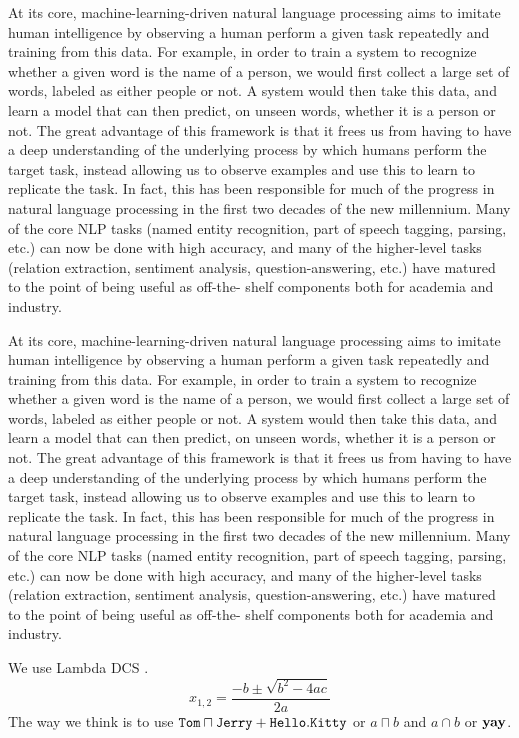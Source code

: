 
At its core, machine-learning-driven natural language processing aims to imitate human
intelligence by observing a human perform a given task repeatedly and training from this
data. For example, in order to train a system to recognize whether a given word is the
name of a person, we would first collect a large set of words, labeled as either people or
not. A system would then take this data, and learn a
model
that can then predict, on unseen
words, whether it is a person or not. The great advantage of this framework is that it frees
us from having to have a deep understanding of the underlying process by which humans
perform the target task, instead allowing us to observe examples and use this to learn to
replicate the task. In fact, this has been responsible for much of the progress in natural
language processing in the first two decades of the new millennium. Many of the core
NLP tasks (named entity recognition, part of speech tagging, parsing, etc.) can now be
done with high accuracy, and many of the higher-level tasks (relation extraction, sentiment
analysis, question-answering, etc.) have matured to the point of being useful as off-the-
shelf components both for academia and industry.

At its core, machine-learning-driven natural language processing aims to imitate human
intelligence by observing a human perform a given task repeatedly and training from this
data. For example, in order to train a system to recognize whether a given word is the
name of a person, we would first collect a large set of words, labeled as either people or
not. A system would then take this data, and learn a
model
that can then predict, on unseen
words, whether it is a person or not. The great advantage of this framework is that it frees
us from having to have a deep understanding of the underlying process by which humans
perform the target task, instead allowing us to observe examples and use this to learn to
replicate the task. In fact, this has been responsible for much of the progress in natural
language processing in the first two decades of the new millennium. Many of the core
NLP tasks (named entity recognition, part of speech tagging, parsing, etc.) can now be
done with high accuracy, and many of the higher-level tasks (relation extraction, sentiment
analysis, question-answering, etc.) have matured to the point of being useful as off-the-
shelf components both for academia and industry.

We use Lambda DCS \cite{Liang2013LambdaDC}.
\begin{equation}
x_{1,2} = \frac{-b\pm\sqrt{b^2-4ac}}{2a}
\end{equation}
The way we think is to use $\mathtt{Tom} \sqcap \mathtt{Jerry} + \mathtt{Hello}.\mathtt{Kitty}$ or $a \sqcap b$ and $a \cap b$ or $\mathbf{yay}$.
